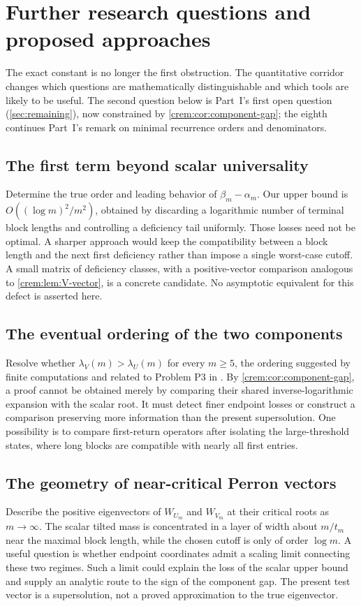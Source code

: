 \documentclass[11pt,a4paper]{article}
\theoremstyle{definition}\newaliascnt{definition}{theorem}
\theoremstyle{remark}\newaliascnt{remark}{theorem}
\begin{document}
\section{Further research questions and proposed approaches}
\label{crem:sec:future}
The exact constant is no longer the first obstruction. The quantitative
corridor changes which questions are mathematically distinguishable and
which tools are likely to be useful. The second question below is Part~I's
first open question (\cref{sec:remaining}), now constrained by
\cref{crem:cor:component-gap}; the eighth continues Part~I's remark on
minimal recurrence orders and denominators.

\subsection{The first term beyond scalar universality}
Determine the true order and leading behavior of $\beta_m-\alpha_m$. Our
upper bound is $O((\log m)^2/m^2)$, obtained by discarding a logarithmic
number of terminal block lengths and controlling a deficiency tail
uniformly. Those losses need not be optimal. A sharper approach would keep
the compatibility between a block length and the next first deficiency
rather than impose a single worst-case cutoff. A small matrix of deficiency
classes, with a positive-vector comparison analogous to
\cref{crem:lem:V-vector}, is a concrete candidate. No asymptotic equivalent
for this defect is asserted here.

\subsection{The eventual ordering of the two components}
Resolve whether $\lambda_V(m)>\lambda_U(m)$ for every $m\ge5$, the ordering
suggested by finite computations and related to Problem P3 in
\cite{MayamaAkita}. By \cref{crem:cor:component-gap}, a proof cannot be
obtained merely by comparing their shared inverse-logarithmic expansion with
the scalar root. It must detect finer endpoint losses or construct a
comparison preserving more information than the present supersolution. One
possibility is to compare first-return operators after isolating the
large-threshold states, where long blocks are compatible with nearly all
first entries.

\subsection{The geometry of near-critical Perron vectors}
Describe the positive eigenvectors of $W_{U_m}$ and $W_{V_m}$ at their
critical roots as $m\to\infty$. The scalar tilted mass is concentrated in a
layer of width about $m/t_m$ near the maximal block length, while the chosen
cutoff is only of order $\log m$. A useful question is whether endpoint
coordinates admit a scaling limit connecting these two regimes. Such a limit
could explain the loss of the scalar upper bound and supply an analytic
route to the sign of the component gap. The present test vector is a
supersolution, not a proved approximation to the true eigenvector.
\end{document}
